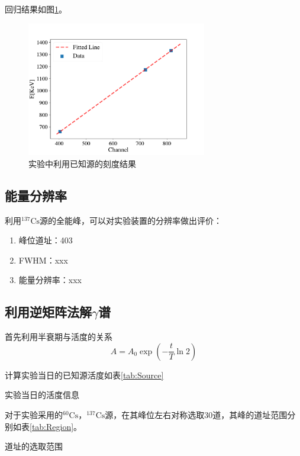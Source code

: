 \documentclass{article}
\begin{document}
    回归结果如图\ref{fig:Calibration}。
    \begin{figure}[htbp]
        \centering
        \includegraphics[width=0.7\textwidth]{../plots/Calibration.pdf}
        \caption{实验中利用已知源的刻度结果\label{fig:Calibration}}
    \end{figure}
    \subsection{能量分辨率}
    利用$^{137}\text{Cs}$源的全能峰，可以对实验装置的分辨率做出评价：
    \begin{enumerate}
        \item 峰位道址：403
        \item FWHM：xxx
        \item 能量分辨率：xxx
    \end{enumerate}
    \subsection{利用逆矩阵法解$\gamma$谱}
    首先利用半衰期与活度的关系\begin{equation}
        A = A_0\exp(-\frac{t}{T}\ln{2})
    \end{equation}
    
    计算实验当日的已知源活度如表\ref{tab:Source}
    \begin{table}[htbp]
        \centering
        \caption{实验当日的活度信息\label{tab:Source}}
        
    \end{table}

    对于实验采用的$^{60}\text{Cs}$，$^{137}\text{Cs}$源，在其峰位左右对称选取30道，其峰的道址范围分别如表\ref{tab:Region}。
    \begin{table}[htbp]
        \centering
        \caption{道址的选取范围\label{tab:Region}}
        
    \end{table}
    
\end{document}
